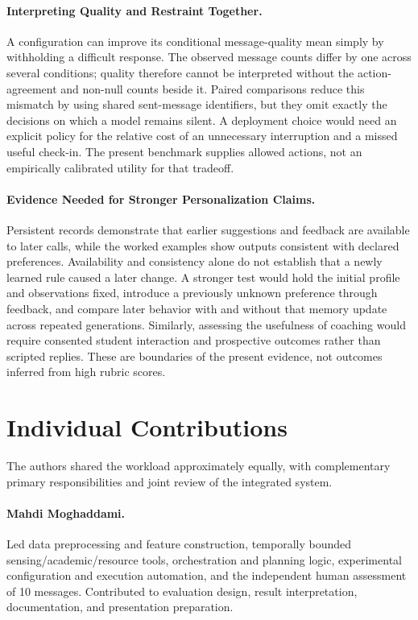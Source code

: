 \documentclass{article}
\begin{document}
\paragraph{Interpreting Quality and Restraint Together.} A configuration can improve its conditional message-quality mean simply by withholding a difficult response. The observed message counts differ by one across several conditions; quality therefore cannot be interpreted without the action-agreement and non-null counts beside it. Paired comparisons reduce this mismatch by using shared sent-message identifiers, but they omit exactly the decisions on which a model remains silent. A deployment choice would need an explicit policy for the relative cost of an unnecessary interruption and a missed useful check-in. The present benchmark supplies allowed actions, not an empirically calibrated utility for that tradeoff.

\paragraph{Evidence Needed for Stronger Personalization Claims.} Persistent records demonstrate that earlier suggestions and feedback are available to later calls, while the worked examples show outputs consistent with declared preferences. Availability and consistency alone do not establish that a newly learned rule caused a later change. A stronger test would hold the initial profile and observations fixed, introduce a previously unknown preference through feedback, and compare later behavior with and without that memory update across repeated generations. Similarly, assessing the usefulness of coaching would require consented student interaction and prospective outcomes rather than scripted replies. These are boundaries of the present evidence, not outcomes inferred from high rubric scores.

\FloatBarrier
\section{Individual Contributions}\label{sec:contributions}
The authors shared the workload approximately equally, with complementary primary responsibilities and joint review of the integrated system.

\paragraph{Mahdi Moghaddami.} Led data preprocessing and feature construction, temporally bounded sensing/academic/resource tools, orchestration and planning logic, experimental configuration and execution automation, and the independent human assessment of 10 messages. Contributed to evaluation design, result interpretation, documentation, and presentation preparation.
\end{document}
